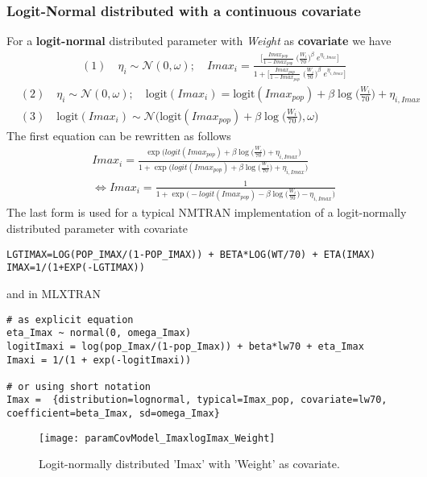 \subsubsection{Logit-Normal distributed with a continuous covariate}
For a \textbf{logit-normal} distributed parameter with \textit{Weight} as \textbf{covariate} we have
\begin{align*}
&(1)\quad \eta_i \sim \mathcal{N}(0,\omega); \quad Imax_i= \frac{\bigg[\frac{Imax_{pop}}{1-Imax_{pop}} \; \big(\frac{W_i}{70}\big)^\beta \; e^{\eta_{i,Imax}} \bigg]}{ 1+  \bigg[\frac{Imax_{pop}}{1-Imax_{pop}} \; \big(\frac{W_i}{70}\big)^\beta \; e^{\eta_{i,Imax}} \bigg]}
\end{align*}
\begin{align*}
&(2)\quad \eta_i \sim \mathcal{N}(0,\omega); \quad \mbox{logit}( Imax_i ) = \mbox{logit}( Imax_{pop} ) + \beta \log\bigg(\frac{W_i}{70}\bigg) + \eta_{i,Imax}  \\
&(3)\quad \mbox{logit}(  Imax_i ) \sim \mathcal{N}\big( \mbox{logit}( Imax_{pop}) + \beta\log\Big(\frac{W_i}{70}\Big),\omega\big)
\end{align*}
The first equation can be rewritten as follows
\begin{align*}
& Imax_i= \frac{\exp\big(logit(Imax_{pop}) + \beta \log\big(\frac{W_i}{70}\big) + \eta_{i,Imax} \big)}{ 1+ \exp\big(logit(Imax_{pop}) + \beta \log\big(\frac{W_i}{70}\big) + \eta_{i,Imax} \big)}  \\
& \Leftrightarrow Imax_i= \frac{1}{ 1+ \exp\big(- logit(Imax_{pop}) - \beta \log\big(\frac{W_i}{70}\big) - \eta_{i,Imax} \big)}
\end{align*}\newline
The last form is used for a typical NMTRAN implementation of a logit-normally distributed parameter with covariate
\begin{lstlisting}
LGTIMAX=LOG(POP_IMAX/(1-POP_IMAX)) + BETA*LOG(WT/70) + ETA(IMAX)
IMAX=1/(1+EXP(-LGTIMAX))
\end{lstlisting}
and in MLXTRAN
\begin{lstlisting}
# as explicit equation
eta_Imax ~ normal(0, omega_Imax)
logitImaxi = log(pop_Imax/(1-pop_Imax)) + beta*lw70 + eta_Imax
Imaxi = 1/(1 + exp(-logitImaxi))

# or using short notation
Imax =	{distribution=lognormal, typical=Imax_pop, covariate=lw70, coefficient=beta_Imax, sd=omega_Imax}
\end{lstlisting}

\begin{figure}[htbp]
\centering
 \texttt{[image: paramCovModel\_ImaxlogImax\_Weight]}
\caption{Logit-normally distributed 'Imax' with 'Weight' as covariate.}
\label{fig:parameterCovModel3}
\end{figure}


